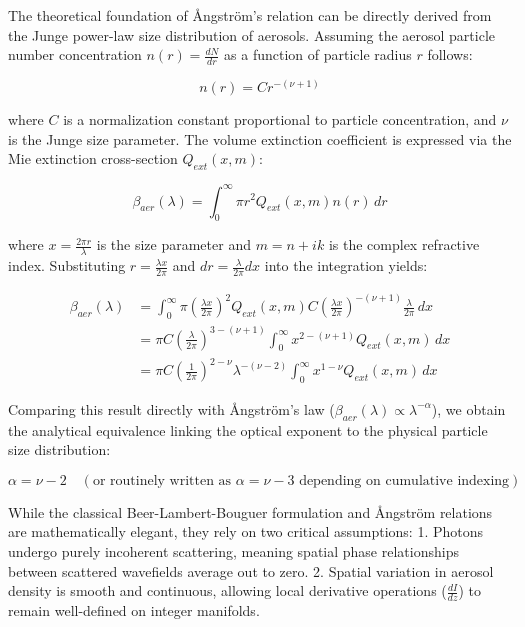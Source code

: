 \documentclass[12pt,a4paper]{article}
\begin{document}
The theoretical foundation of Ångström's relation can be directly derived from the Junge power-law size distribution of aerosols. Assuming the aerosol particle number concentration $n(r) = \frac{dN}{dr}$ as a function of particle radius $r$ follows:

\begin{equation}
n(r) = C r^{-(\nu + 1)}
\label{eq:junge_dist}
\end{equation}

where $C$ is a normalization constant proportional to particle concentration, and $\nu$ is the Junge size parameter. The volume extinction coefficient is expressed via the Mie extinction cross-section $Q_{ext}(x, m)$:

\begin{equation}
\beta_{aer}(\lambda) = \int_0^\infty \pi r^2 Q_{ext}(x, m) n(r) \, dr
\end{equation}

where $x = \frac{2\pi r}{\lambda}$ is the size parameter and $m = n + i k$ is the complex refractive index. Substituting $r = \frac{\lambda x}{2\pi}$ and $dr = \frac{\lambda}{2\pi} dx$ into the integration yields:

\begin{align}
\beta_{aer}(\lambda) &= \int_0^\infty \pi \left( \frac{\lambda x}{2\pi} \right)^2 Q_{ext}(x, m) C \left( \frac{\lambda x}{2\pi} \right)^{-(\nu + 1)} \frac{\lambda}{2\pi} \, dx \nonumber \\
&= \pi C \left( \frac{\lambda}{2\pi} \right)^{3 - (\nu + 1)} \int_0^\infty x^{2 - (\nu + 1)} Q_{ext}(x, m) \, dx \nonumber \\
&= \pi C \left( \frac{1}{2\pi} \right)^{2 - \nu} \lambda^{-(\nu - 2)} \int_0^\infty x^{1 - \nu} Q_{ext}(x, m) \, dx
\end{align}

Comparing this result directly with Ångström's law ($\beta_{aer}(\lambda) \propto \lambda^{-\alpha}$), we obtain the analytical equivalence linking the optical exponent to the physical particle size distribution:

\begin{equation}
\alpha = \nu - 2 \quad (\text{or routinely written as } \alpha = \nu - 3 \text{ depending on cumulative indexing})
\label{eq:alpha_junge_relation}
\end{equation}

While the classical Beer-Lambert-Bouguer formulation and Ångström relations are mathematically elegant, they rely on two critical assumptions:
1. Photons undergo purely incoherent scattering, meaning spatial phase relationships between scattered wavefields average out to zero.
2. Spatial variation in aerosol density is smooth and continuous, allowing local derivative operations ($\frac{dI}{dz}$) to remain well-defined on integer manifolds.
\end{document}
